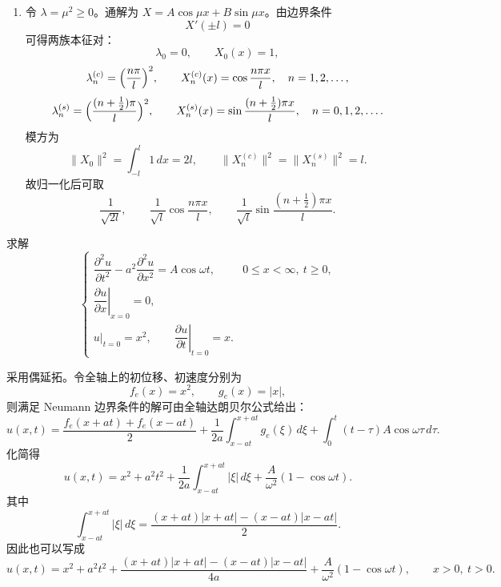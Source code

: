 \begin{question}[简单计算和回答]
\begin{solution}
\begin{enumerate}[label=(\arabic*),leftmargin=2.6em,itemsep=0.25em,topsep=0.2em]
\item 令 $\lambda=\mu^2\ge 0$。通解为 $X=A\cos \mu x+B\sin \mu x$。由边界条件
\[
X'(\pm l)=0
\]
可得两族本征对：
\[
\lambda_0=0,\qquad X_0(x)=1,
\]
\[
\lambda_n^{(c)}=\Bigl(\frac{n\pi}{l}\Bigr)^2,\qquad X_n^{(c)}(x)=\cos\frac{n\pi x}{l},\quad n=1,2,\dots,
\]
\[
\lambda_n^{(s)}=\Bigl(\frac{(n+\tfrac12)\pi}{l}\Bigr)^2,
\qquad X_n^{(s)}(x)=\sin\frac{(n+\tfrac12)\pi x}{l},\quad n=0,1,2,\dots.
\]
模方为
\[
\|X_0\|^2=\int_{-l}^{l}1\,dx=2l,
\qquad
\|X_n^{(c)}\|^2=\|X_n^{(s)}\|^2=l.
\]
故归一化后可取
\[
\frac{1}{\sqrt{2l}},\qquad \frac{1}{\sqrt l}\cos\frac{n\pi x}{l},
\qquad \frac{1}{\sqrt l}\sin\frac{(n+\tfrac12)\pi x}{l}.
\]
\end{enumerate}


\end{solution}
\end{question}

\begin{question}[一维弦受迫振动的半无界定解问题]

求解
\[
\begin{cases}
\dfrac{\partial^2u}{\partial t^2}-a^2\dfrac{\partial^2u}{\partial x^2}=A\cos\omega t,
&0\le x<\infty,\ t\ge 0,\\
\left.\dfrac{\partial u}{\partial x}\right|_{x=0}=0,\\
u|_{t=0}=x^2,\qquad \left.\dfrac{\partial u}{\partial t}\right|_{t=0}=x.
\end{cases}
\]

\begin{solution}

采用偶延拓。令全轴上的初位移、初速度分别为
\[
f_e(x)=x^2,\qquad g_e(x)=|x|,
\]
则满足 Neumann 边界条件的解可由全轴达朗贝尔公式给出：
\[
 u(x,t)=\frac{f_e(x+at)+f_e(x-at)}{2}+\frac{1}{2a}\int_{x-at}^{x+at}g_e(\xi)\,d\xi
 +\int_0^t (t-\tau)A\cos\omega\tau\,d\tau.
\]
化简得
\[
 u(x,t)=x^2+a^2t^2+\frac{1}{2a}\int_{x-at}^{x+at}|\xi|\,d\xi+\frac{A}{\omega^2}(1-\cos\omega t).
\]
其中
\[
\int_{x-at}^{x+at}|\xi|\,d\xi
=\frac{(x+at)|x+at|-(x-at)|x-at|}{2}.
\]
因此也可以写成
\[
 u(x,t)=x^2+a^2t^2+
 \frac{(x+at)|x+at|-(x-at)|x-at|}{4a}
 +\frac{A}{\omega^2}(1-\cos\omega t),\qquad x>0,\ t>0.
\]


\end{solution}
\end{question}

